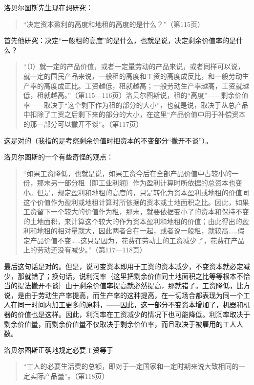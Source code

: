 洛贝尔图斯先生现在想研究：

\begin{quote}{“决定资本盈利的高度和地租的高度的是什么？”（第115页）}\end{quote}


首先他研究：决定“一般租的高度”的是什么，也就是说，决定剩余价值率的是什么？

\begin{quote}{“（I）就一定的产品价值，或者一定量劳动的产品来说，或者同样可以说，就一定的国民产品来说，一般租的高度和工资的高度成反比，和一般劳动生产率的高度成正比。工资越低，租就越高；一般劳动生产率越高，工资就越低，租就越高。”（第115—116页）洛贝尔图斯说，租的“高度”——剩余价值率——取决于“这个剩下作为租的部分的大小”，也就是说，取决于从总产品中扣除了工资之后剩下来的部分的大小，在这里“产品价值中用于补偿资本的那一部分可以撇开不谈”。（第117页）}\end{quote}

这是对的（我指的是考察剩余价值时把资本的不变部分“撇开不谈”）。

洛贝尔图斯的一个有些奇怪的观点：

\begin{quote}{“如果工资降低，也就是说，如果工资今后在全部产品价值中占较小的一份，那末另一部分租｛即工业利润｝作为盈利计算时所依据的总资本也变小。但是，规定盈利和地租的高度的，只是转化为资本盈利或地租的价值同这个价值作为盈利或地租计算时所依据的资本或土地面积之比。因此，如果工资留下一个较大的价值作为租，那末，就要依据变小了的资本和保持不变的土地面积，来计算这个较大的作为资本盈利和地租的价值；由此得出的盈利和地租的相对量就大，因此两者合在一起，或者说一般租，就较高……假定产品价值不变……这只是因为，花费在劳动上的工资减少了，花费在产品上的劳动还没有减少。”（第117—118页）}\end{quote}

最后这句话是对的。但是，说可变资本即用于工资的资本减少，不变资本就必定减少，那就错了；换句话，说利润率｛这里把剩余价值同土地面积之比等等根本不恰当的提法撇开不谈｝由于剩余价值率提高就必然提高，那就错了。工资降低，比方说，是由于劳动生产率提高，而生产率的这种提高，在一切场合都表现为同一个工人在同一时间内加工更多的原料，——因此，这一部分不变资本增加了，机器和机器的价值也是这样。因此，利润率在工资减少的情况下也可能降低。利润率取决于剩余价值量，而剩余价值量不仅取决于剩余价值率，而且取决于被雇用的工人人数。

洛贝尔图斯正确地规定必要工资等于

\begin{quote}{“工人的必要生活费的总额，即对于一定国家和一定时期来说大致相同的一定实际产品量”。（第118页）}\end{quote}

